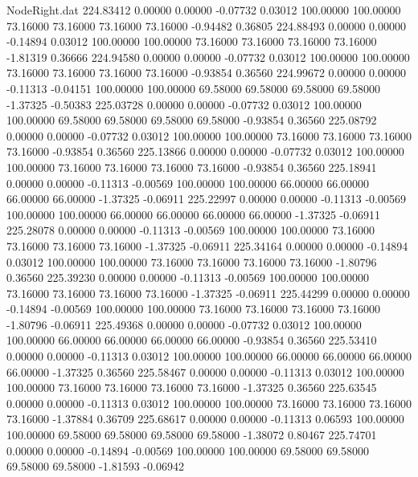 \begin{filecontents}{NodeRight.dat}
 224.83412    0.00000    0.00000    -0.07732    0.03012  100.00000  100.00000   73.16000   73.16000   73.16000   73.16000   -0.94482    0.36805
 224.88493    0.00000    0.00000    -0.14894    0.03012  100.00000  100.00000   73.16000   73.16000   73.16000   73.16000   -1.81319    0.36666
 224.94580    0.00000    0.00000    -0.07732    0.03012  100.00000  100.00000   73.16000   73.16000   73.16000   73.16000   -0.93854    0.36560
 224.99672    0.00000    0.00000    -0.11313   -0.04151  100.00000  100.00000   69.58000   69.58000   69.58000   69.58000   -1.37325   -0.50383
 225.03728    0.00000    0.00000    -0.07732    0.03012  100.00000  100.00000   69.58000   69.58000   69.58000   69.58000   -0.93854    0.36560
 225.08792    0.00000    0.00000    -0.07732    0.03012  100.00000  100.00000   73.16000   73.16000   73.16000   73.16000   -0.93854    0.36560
 225.13866    0.00000    0.00000    -0.07732    0.03012  100.00000  100.00000   73.16000   73.16000   73.16000   73.16000   -0.93854    0.36560
 225.18941    0.00000    0.00000    -0.11313   -0.00569  100.00000  100.00000   66.00000   66.00000   66.00000   66.00000   -1.37325   -0.06911
 225.22997    0.00000    0.00000    -0.11313   -0.00569  100.00000  100.00000   66.00000   66.00000   66.00000   66.00000   -1.37325   -0.06911
 225.28078    0.00000    0.00000    -0.11313   -0.00569  100.00000  100.00000   73.16000   73.16000   73.16000   73.16000   -1.37325   -0.06911
 225.34164    0.00000    0.00000    -0.14894    0.03012  100.00000  100.00000   73.16000   73.16000   73.16000   73.16000   -1.80796    0.36560
 225.39230    0.00000    0.00000    -0.11313   -0.00569  100.00000  100.00000   73.16000   73.16000   73.16000   73.16000   -1.37325   -0.06911
 225.44299    0.00000    0.00000    -0.14894   -0.00569  100.00000  100.00000   73.16000   73.16000   73.16000   73.16000   -1.80796   -0.06911
 225.49368    0.00000    0.00000    -0.07732    0.03012  100.00000  100.00000   66.00000   66.00000   66.00000   66.00000   -0.93854    0.36560
 225.53410    0.00000    0.00000    -0.11313    0.03012  100.00000  100.00000   66.00000   66.00000   66.00000   66.00000   -1.37325    0.36560
 225.58467    0.00000    0.00000    -0.11313    0.03012  100.00000  100.00000   73.16000   73.16000   73.16000   73.16000   -1.37325    0.36560
 225.63545    0.00000    0.00000    -0.11313    0.03012  100.00000  100.00000   73.16000   73.16000   73.16000   73.16000   -1.37884    0.36709
 225.68617    0.00000    0.00000    -0.11313    0.06593  100.00000  100.00000   69.58000   69.58000   69.58000   69.58000   -1.38072    0.80467
 225.74701    0.00000    0.00000    -0.14894   -0.00569  100.00000  100.00000   69.58000   69.58000   69.58000   69.58000   -1.81593   -0.06942

\end{filecontents}
